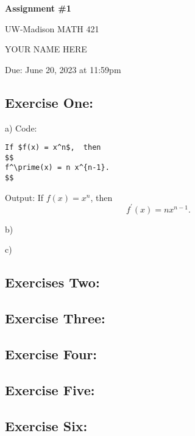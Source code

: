 \documentclass{article} %
\begin{document}
\begin{center}
\Large{\textbf{Assignment \#1}
            
UW-Madison MATH 421} %
\vspace{5pt}
        
\normalsize{  YOUR NAME HERE%
        
Due:  June 20, 2023 at 11:59pm}        
\vspace{15pt}
        
\end{center}


    
\subsection*{Exercise One:} 
    
a) Code:
\begin{verbatim}
If $f(x) = x^n$,  then 
$$
f^\prime(x) = n x^{n-1}.
$$
\end{verbatim}

Output: If $f(x) = x^n$,  then 
$$
f^\prime(x) = n x^{n-1}.
$$

 b)

 c)

    
\subsection*{Exercises Two:}     
    
\subsection*{Exercise Three:}

\subsection*{Exercise Four:}

\subsection*{Exercise Five:}

\subsection*{Exercise Six:}


    
    
\end{document}
